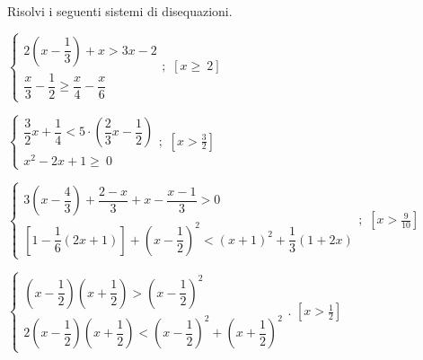 \begin{esercizio}[\Ast]
 \label{ese:21.41}
 Risolvi i seguenti sistemi di disequazioni.

 \begin{enumeratea}
 \item {\longarray $\left\{\begin{array}{l}
  2\left(x-\dfrac{1}{3}\right)+x>3x-2\\
	\dfrac{x}{3}-\dfrac{1}{2}\ge \dfrac{x}{4}-\dfrac{x}{6}
   \end{array}\right.;$}
 \hfill $\left[x\ge~2\right]$
\item $\left\{\begin{array}{l}
    \dfrac{3}{2}x+\dfrac{1}{4}<5\cdot\left(\dfrac{2}{3}x-\dfrac{1}{2}\right)\\
    x^2-2x+1\ge~0
   \end{array}\right.;$
 \hfill $\left[x>\frac{3}{2}\right]$
\item {\longarray $\left\{\begin{array}{l}
  3\left(x-\dfrac{4}{3}\right)+\dfrac{2-x}{3}+x-\dfrac{x-1}{3}>0\\
	
\left[1-\dfrac{1}{6}(2x+1)\right]+\left(x-\dfrac{1}{2}\right)^{2}<(x+1)^{2}
+\dfrac{1}{3}(1+2x)
   \end{array}\right.;$}
 \hfill $\left[x>\frac{9}{10}\right]$
\item {\longarray $\left\{\begin{array}{l}
	
\left(x-\dfrac{1}{2}\right)\left(x+\dfrac{1}{2}\right)>\left(x-\dfrac{1}{2}
\right)^{2}\\
  
2\left(x-\dfrac{1}{2}\right)\left(x+\dfrac{1}{2}\right)<\left(x-\dfrac{1}{2}
\right)^{2}+\left(x+\dfrac{1}{2}\right)^{2}
   \end{array}\right..$}
 \hfill $\left[x>\frac{1}{2}\right]$
 \end{enumeratea}
\end{esercizio}


